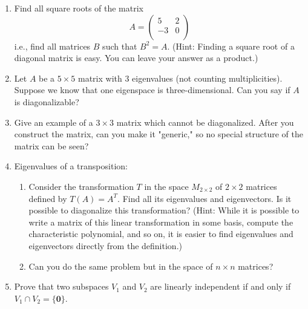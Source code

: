 \documentclass[../psets.tex]{subfiles}
\begin{document}
\begin{enumerate}[label={\textbf{2.\arabic*.}}]
\begin{enumerate}
    \end{enumerate}
    \item Find all square roots of the matrix
    \begin{equation*}
        A =
        \begin{pmatrix}
            5 & 2\\
            -3 & 0\\
        \end{pmatrix}
    \end{equation*}
    i.e., find all matrices $B$ such that $B^2=A$. (Hint: Finding a square root of a diagonal matrix is easy. You can leave your answer as a product.)
    \item Let $A$ be a $5\times 5$ matrix with 3 eigenvalues (not counting multiplicities). Suppose we know that one eigenspace is three-dimensional. Can you say if $A$ is diagonalizable?
    \item Give an example of a $3\times 3$ matrix which cannot be diagonalized. After you construct the matrix, can you make it "generic," so no special structure of the matrix can be seen?
    \item Eigenvalues of a transposition:
    \begin{enumerate}
        \item Consider the transformation $T$ in the space $M_{2\times 2}$ of $2\times 2$ matrices defined by $T(A)=A^T$. Find all its eigenvalues and eigenvectors. Is it possible to diagonalize this transformation? (Hint: While it is possible to write a matrix of this linear transformation in some basis, compute the characteristic polynomial, and so on, it is easier to find eigenvalues and eigenvectors directly from the definition.)
        \item Can you do the same problem but in the space of $n\times n$ matrices?
    \end{enumerate}
    \item Prove that two subspaces $V_1$ and $V_2$ are linearly independent if and only if $V_1\cap V_2=\{\bm{0}\}$.
\end{enumerate}
\end{document}
